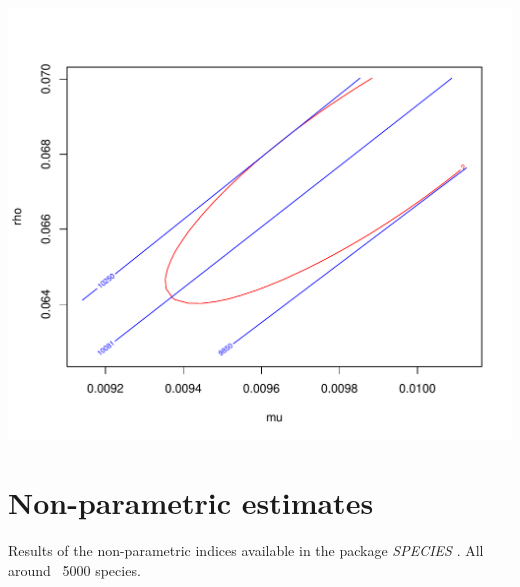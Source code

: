 \documentclass[12pt, A4]{article}\usepackage[]{graphicx}\usepackage[]{color}
\makeatletter
\def\maxwidth{ %
  \ifdim\Gin@nat@width>\linewidth
    \linewidth
  \else
    \Gin@nat@width
  \fi
}
\newenvironment{knitrout}{}{} %
\makeatother
\begin{document}
\begin{knitrout}
\color{fgcolor}

{\centering \includegraphics[width=\maxwidth]{figure/beta-binomial_likelihood_surface-1} 

}



\end{knitrout}

\section*{Non-parametric estimates}

Results of the non-parametric indices
available in the package \emph{SPECIES} \citep{SPECIES}.
All around ~5000 species.
\end{document}
